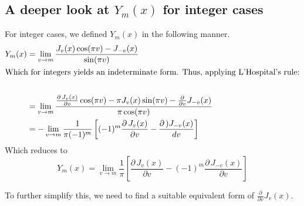 \documentclass[]{article}
\begin{document}
\subsection{A deeper look at $Y_m(x)$ for integer cases}
For integer cases, we defined $Y_m(x)$ in the following manner.
\begin{align*}
	Y_m(x) &= \lim\limits_{v \to m} \frac{J_v(x)\cos(\pi v) - J_{-v}(x)}{\sin(\pi v)}\\
	\intertext{Which for integers yields an indeterminate form. Thus, applying L'Hospital's rule:} \\
	&= \lim\limits_{v \to m} \frac{\frac{\partial \, J_v(x)}{\partial v}\cos(\pi v) - \pi J_v(x)\sin(\pi v) -\frac{\partial}{\partial v}J_{-v}(x)}{\pi \cos(\pi v)}\\
	&=-\lim\limits_{v \to m}\frac{1}{\pi (-1)^m} \left[ 
	(-1)^m\frac{\partial \, J_v(x)}{\partial v} - 
	\frac{\partial \, )J_{-v}(x)}{dv}
	\right] \\
\end{align*}
Which reduces to
\begin{equation} \label{eq:yn1}
	Y_m(x)=\lim\limits_{v \to m} \frac{1}{\pi}\left[ \frac{\partial\, J_v(x)}{\partial v} - (-1)^m \frac{\partial \, J_{-v}(x)}{\partial v}\right]
\end{equation}		

To further simplify this, we need to find a suitable equivalent form of $\frac{\partial}{\partial v} J_v(x) $.
\end{document}
